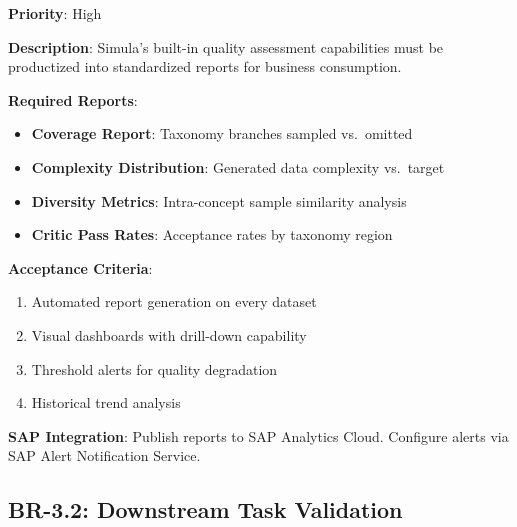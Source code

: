 \documentclass[12pt,a4paper,twoside]{report}
\begin{document}
\begin{tcolorbox}[colback=yellow!5,colframe=yellow!70,title=BR-3.1: Standardized Quality Reporting]
\textbf{Priority}: High

\textbf{Description}: Simula's built-in quality assessment capabilities must be
productized into standardized reports for business consumption.

\textbf{Required Reports}:
\begin{itemize}
\item \textbf{Coverage Report}: Taxonomy branches sampled vs.\ omitted
\item \textbf{Complexity Distribution}: Generated data complexity vs.\ target
\item \textbf{Diversity Metrics}: Intra-concept sample similarity analysis
\item \textbf{Critic Pass Rates}: Acceptance rates by taxonomy region
\end{itemize}

\textbf{Acceptance Criteria}:
\begin{enumerate}
\item Automated report generation on every dataset
\item Visual dashboards with drill-down capability
\item Threshold alerts for quality degradation
\item Historical trend analysis
\end{enumerate}

\textbf{SAP Integration}: Publish reports to SAP Analytics Cloud. Configure
alerts via SAP Alert Notification Service.
\end{tcolorbox}

\subsection{BR-3.2: Downstream Task Validation}
\end{document}
